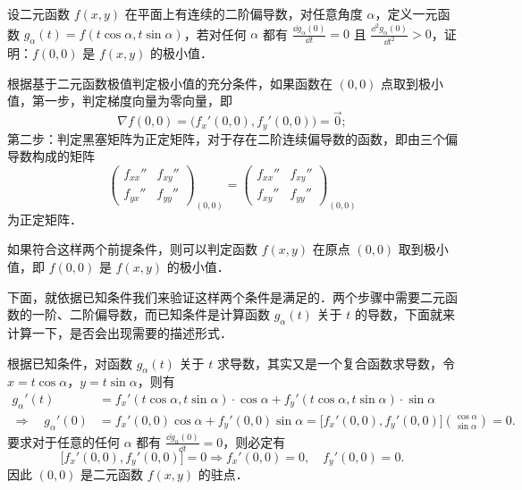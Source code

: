 设二元函数 $f(x,y)$ 在平面上有连续的二阶偏导数，对任意角度 $\alpha$，定义一元函数 $g_\alpha(t)=f(t\cos\alpha,t\sin\alpha)$，若对任何 $\alpha$ 都有 $\displaystyle \frac{\dd g_\alpha(0)}{\dd t}=0$ 且 $\displaystyle \frac{\dd^2 g_\alpha(0)}{\dd t^2}>0$，证明：$f(0,0)$ 是 $f(x,y)$ 的极小值．
\begin{solution}
  根据基于二元函数极值判定极小值的充分条件，如果函数在 $(0,0)$ 点取到极小值，第一步，判定梯度向量为零向量，即
  \[
    \nabla f(0,0)=\bigl(f_x'(0,0),f_y'(0,0)\bigr)=\vec{0};
  \]
  第二步：判定黑塞矩阵为正定矩阵，对于存在二阶连续偏导数的函数，即由三个偏导数构成的矩阵
  \[
    \begin{pmatrix}
      f_{xx}''&f_{xy}''\\
      f_{yx}''&f_{yy}''
    \end{pmatrix}_{(0,0)}
    =\begin{pmatrix}
      f_{xx}''&f_{xy}''\\
      f_{xy}''&f_{yy}''
    \end{pmatrix}_{(0,0)}
  \]
  为正定矩阵．

  如果符合这样两个前提条件，则可以判定函数 $f(x,y)$ 在原点 $(0,0)$ 取到极小值，即 $f(0,0)$ 是 $f(x,y)$ 的极小值．

  下面，就依据已知条件我们来验证这样两个条件是满足的．两个步骤中需要二元函数的一阶、二阶偏导数，而已知条件是计算函数 $g_\alpha(t)$ 关于 $t$ 的导数，下面就来计算一下，是否会出现需要的描述形式．

  根据已知条件，对函数 $g_\alpha(t)$ 关于 $t$ 求导数，其实又是一个复合函数求导数，令 $x=t\cos\alpha$，$y=t\sin\alpha$，则有
  \begin{align*}
    g_\alpha'(t)&=f_x'(t\cos\alpha,t\sin\alpha)\cdot\cos\alpha
      +f_y'(t\cos\alpha,t\sin\alpha)\cdot\sin\alpha\\
    \Rightarrow\quad g_\alpha'(0)&=f_x'(0,0)\cos\alpha+f_y'(0,0)\sin\alpha
      =\bigl[f_x'(0,0),f_y'(0,0)\bigr]\binom{\cos\alpha}{\sin\alpha}=0.
  \end{align*}
  要求对于任意的任何 $\alpha$ 都有 $\displaystyle \frac{\dd g_\alpha(0)}{\dd t}=0$，则必定有
  \[
    \bigl[f_x'(0,0),f_y'(0,0)\bigr]=0
    \Rightarrow f_x'(0,0)=0,\quad f_y'(0,0)=0.
  \]
  因此 $(0,0)$ 是二元函数 $f(x,y)$ 的驻点．


\end{solution}
